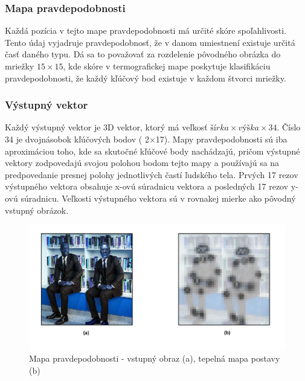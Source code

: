 \documentclass[slovak,master,dept460,male,cpp,cpdeclaration]{diploma}
\begin{document}
\subsubsection*{Mapa pravdepodobnosti}
Každá pozícia v tejto mape pravdepodobnosti má určité skóre spoľahlivosti. Tento údaj vyjadruje pravdepodobnosť, že v danom umiestnení existuje určitá časť daného typu. Dá sa to považovať za rozdelenie pôvodného obrázka do mriežky \textit{$15\times 15$}, kde skóre v termografickej mape poskytuje klasifikáciu pravdepodobnosti, že každý kľúčový bod existuje v každom štvorci mriežky.

\subsubsection*{Výstupný vektor}
Každý výstupný vektor je 3D vektor, ktorý má veľkosť \textit{$šírka  \times výška \times 34$}. Číslo 34 je dvojnásobok kľúčových bodov ( 2$\times$17). Mapy pravdepodobnosti sú iba aproximáciou toho, kde sa skutočné kľúčové body nachádzajú, pričom výstupné vektory zodpovedajú svojou polohou bodom tejto mapy a používajú sa na predpovedanie presnej polohy jednotlivých častí ľudského tela. Prvých 17 rezov výstupného vektora obsahuje x-ovú súradnicu vektora a posledných 17 rezov y-ovú súradnicu. Veľkosti výstupného vektora sú v rovnakej mierke ako pôvodný vstupný obrázok.

\begin{figure}[H]
	\centering
	\includegraphics[width=1\textwidth]{Figures/tfPose1.png}
	\caption{Mapa pravdepodobnosti  - vstupný obraz (a), tepelná mapa postavy (b)\cite{githubTF}}
	\label{fig:tfPoseHeatmap}
\end{figure}
\end{document}

